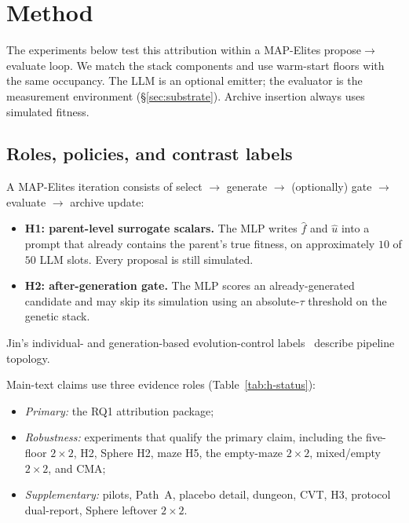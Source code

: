 \documentclass[preprint,12pt]{elsarticle}
\begin{document}
\section{Method}
\label{sec:method}

The experiments below test this attribution within a MAP-Elites propose$\rightarrow$evaluate loop. We match the stack components and use warm-start floors with the same occupancy. The LLM is an optional emitter; the evaluator is the measurement environment (\S\ref{sec:substrate}). Archive insertion always uses simulated fitness.

\subsection{Roles, policies, and contrast labels}
\label{sec:terminology}

A MAP-Elites iteration consists of select $\rightarrow$ generate $\rightarrow$ (optionally) gate $\rightarrow$ evaluate $\rightarrow$ archive update:

\begin{itemize}
  \item \textbf{H1: parent-level surrogate scalars.} The MLP writes $\hat f$ and $\hat u$ into a prompt that already contains the parent's true fitness, on approximately $10$ of $50$ LLM slots. Every proposal is still simulated.
  \item \textbf{H2: after-generation gate.} The MLP scores an already-generated candidate and may skip its simulation using an absolute-$\tau$ threshold on the genetic stack.
\end{itemize}

Jin's individual- and generation-based evolution-control labels~\cite{jin2005fitness} describe pipeline topology.

Main-text claims use three evidence roles (Table~\ref{tab:h-status}):
\begin{itemize}
  \item \emph{Primary:} the RQ1 attribution package;
  \item \emph{Robustness:} experiments that qualify the primary claim, including the five-floor $2\times2$, H2, Sphere H2, maze H5, the empty-maze $2\times2$, mixed/empty $2\times2$, and CMA;
  \item \emph{Supplementary:} pilots, Path~A, placebo detail, dungeon, CVT, H3, protocol dual-report, Sphere leftover $2\times2$.
\end{itemize}
\end{document}
